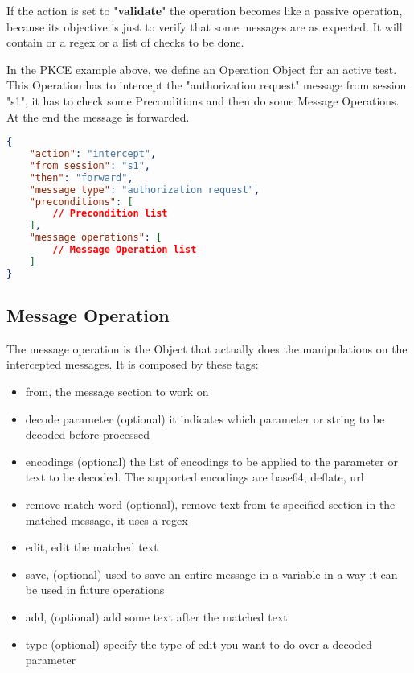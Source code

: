 If the action is set to "\textbf{validate}" the operation becomes like a passive operation, because its objective is just to verify that some messages are as expected. It will contain or a regex or a list of checks to be done.

In the PKCE example above, we define an Operation Object for an active test. This Operation has to intercept the "authorization request" message from session "s1", it has to check some Preconditions and then do some Message Operations. At the end the message is forwarded.

\begin{lstlisting}[language=json]
{
    "action": "intercept",
    "from session": "s1",
    "then": "forward",
    "message type": "authorization request",
    "preconditions": [
        // Precondition list
    ],
    "message operations": [
        // Message Operation list
    ]
}
\end{lstlisting}

\subsection{Message Operation}
The message operation is the Object that actually does the manipulations on the intercepted messages. It is composed by these tags:
\begin{itemize}
    \item from, the message section to work on
    \item decode parameter (optional) it indicates which parameter or string to be decoded before processed
    \item encodings (optional) the list of encodings to be applied to the parameter or text to be decoded. The supported encodings are base64, deflate, url
    \item remove match word (optional), remove text from te specified section in the matched message, it uses a regex
    \item edit, edit the matched text
    \item save, (optional) used to save an entire message in a variable in a way it can be used in future operations
    \item add, (optional) add some text after the matched text
    \item type (optional) specify the type of edit you want to do over a decoded parameter
\end{itemize}

